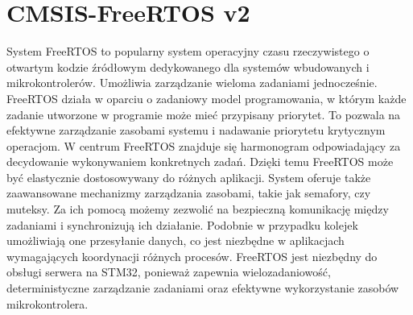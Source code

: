 \section{CMSIS-FreeRTOS v2}
System FreeRTOS to popularny system operacyjny czasu rzeczywistego o otwartym kodzie źródłowym dedykowanego dla systemów wbudowanych i mikrokontrolerów. Umożliwia zarządzanie wieloma zadaniami jednocześnie. FreeRTOS działa w oparciu o zadaniowy model programowania, w którym każde zadanie utworzone w programie może mieć przypisany priorytet. To pozwala na efektywne zarządzanie zasobami systemu i nadawanie priorytetu krytycznym operacjom. \newline 
\noindent W centrum FreeRTOS znajduje się harmonogram odpowiadający za decydowanie wykonywaniem konkretnych zadań. Dzięki temu FreeRTOS może być elastycznie dostosowywany do różnych aplikacji.
System oferuje także zaawansowane mechanizmy zarządzania zasobami, takie jak semafory, czy muteksy. Za ich pomocą możemy zezwolić na bezpieczną komunikację między zadaniami i synchronizują ich działanie. Podobnie w przypadku kolejek umożliwiają one przesyłanie danych, co jest niezbędne w aplikacjach wymagających koordynacji różnych procesów. \newline 
\noindent FreeRTOS jest niezbędny do obsługi serwera na STM32, ponieważ zapewnia wielozadaniowość, deterministyczne zarządzanie zadaniami oraz efektywne wykorzystanie zasobów mikrokontrolera.
